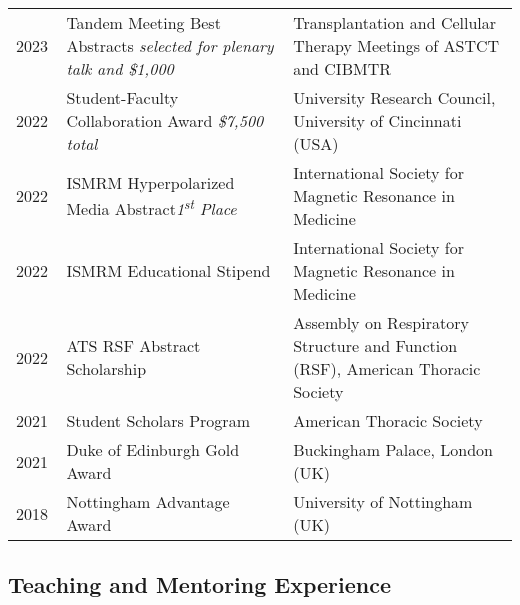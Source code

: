 \documentclass[12pt,]{scrartcl}
\begin{document}
\begin{table}[!h]
{\def\arraystretch{1.5}\tabcolsep=0pt
\begin{tabular}{p{0.10\linewidth}p{0.45\linewidth}p{0.45\linewidth}}
    2023 & Tandem Meeting Best Abstracts \newline \textit{selected for plenary talk and \$1,000}  & Transplantation and Cellular Therapy \newline Meetings of ASTCT and CIBMTR \\
    
    2022 & Student-Faculty Collaboration Award \newline \textit{\$7,500 total} & University Research Council, University of Cincinnati (USA) \\
    
    2022 & ISMRM Hyperpolarized Media Abstract\newline \textit{1\textsuperscript{st} Place} & International Society for Magnetic Resonance in Medicine \\
    
    2022 & ISMRM Educational Stipend & International Society for Magnetic Resonance in Medicine \\
    
    2022 & ATS RSF Abstract Scholarship & Assembly on Respiratory Structure and Function (RSF), American Thoracic Society \\ 

    2021 & Student Scholars Program & American Thoracic Society  \\
  
  2021 & Duke of Edinburgh Gold Award & Buckingham Palace, London (UK) \\
  
  2018 & Nottingham Advantage Award & University of Nottingham (UK) \\

\end{tabular}%
}
\end{table}

\subsection{Teaching and Mentoring Experience}\label{teaching}
\end{document}
